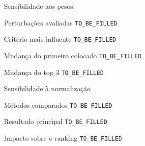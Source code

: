 
\begin{frame}{Sensibilidade aos pesos}

    \begin{block}{Perturbações avaliadas}
        \texttt{TO\_BE\_FILLED}
    \end{block}

    \vspace{0.2cm}

    \begin{block}{Critério mais influente}
        \texttt{TO\_BE\_FILLED}
    \end{block}

    \vspace{0.2cm}

    \begin{block}{Mudança do primeiro colocado}
        \texttt{TO\_BE\_FILLED}
    \end{block}

    \vspace{0.2cm}

    \begin{block}{Mudança do top 3}
        \texttt{TO\_BE\_FILLED}
    \end{block}

\end{frame}



\begin{frame}{Sensibilidade à normalização}

    \begin{block}{Métodos comparados}
        \texttt{TO\_BE\_FILLED}
    \end{block}

    \vspace{0.3cm}

    \begin{block}{Resultado principal}
        \texttt{TO\_BE\_FILLED}
    \end{block}

    \vspace{0.3cm}

    \begin{block}{Impacto sobre o ranking}
        \texttt{TO\_BE\_FILLED}
    \end{block}

\end{frame}


